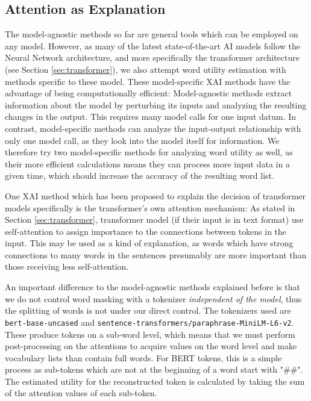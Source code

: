 \subsection{Attention as Explanation}
The model-agnostic methods so far are general tools which can be employed on any model.
However, as many of the latest state-of-the-art AI models follow the Neural Network architecture, and more specifically the transformer architecture (see Section \ref{sec:transformer}), we also attempt word utility estimation with methods specific to these model.
These model-specific XAI methods have the advantage of being computationally efficient:
Model-agnostic methods extract information about the model by perturbing its inputs and analyzing the resulting changes in the output.
This requires many model calls for one input datum.
In contrast, model-specific methods can analyze the input-output relationship with only one model call, as they look into the model itself for information.
We therefore try two model-specific methods for analyzing word utility as well, as their more efficient calculations means they can process more input data in a given time, which should increase the accuracy of the resulting word list.


One XAI method which has been proposed to explain the decision of transformer models specifically is the transformer's own attention mechanism:
As stated in Section \ref{sec:transformer}, transformer model (if their input is in text format) use self-attention to assign importance to the connections between tokens in the input.
This may be used as a kind of explanation, as words which have strong connections to many words in the sentences presumably are more important than those receiving less self-attention.

An important difference to the model-agnostic methods explained before is that we do not control word masking with a tokenizer \textit{independent of the model}, thus the splitting of words is not under our direct control.
The tokenizers used are \texttt{bert-base-uncased} and \texttt{sentence-transformers/paraphrase-MiniLM-L6-v2}.
These produce tokens on a sub-word level, which means that we must perform post-processing on the attentions to acquire values on the word level and make vocabulary lists than contain full words.
For BERT tokens, this is a simple process as sub-tokens which are not at the beginning of a word start with "\#\#".
The estimated utility for the reconstructed token is calculated by taking the sum of the attention values of each sub-token.

